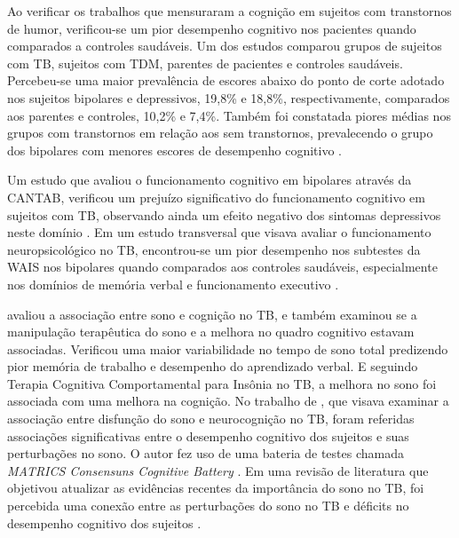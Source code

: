 \documentclass[chapter=TITLE,
               oneside,
               12pt,
               a4paper,
               english,
               brazil]{abntex2}    %
\begin{document}
        Ao verificar os trabalhos que mensuraram a cognição em sujeitos com
        transtornos de humor, verificou-se um pior desempenho cognitivo
        nos pacientes quando comparados a controles saudáveis. Um dos estudos
        comparou grupos de sujeitos com TB, sujeitos com TDM, parentes de
        pacientes e controles saudáveis. Percebeu-se uma maior prevalência
        de escores abaixo do ponto de corte adotado nos sujeitos bipolares e
        depressivos, 19,8\% e 18,8\%, respectivamente, comparados aos parentes
        e controles, 10,2\% e 7,4\%. Também foi constatada piores médias nos
        grupos com transtornos em relação aos sem transtornos, prevalecendo o
        grupo dos bipolares com menores escores de desempenho cognitivo
        \parencite{schneider_cognitive_2008,
        bo_comparison_2019}.

        Um estudo que avaliou o funcionamento cognitivo em bipolares através
        da CANTAB, verificou um prejuízo significativo do funcionamento
        cognitivo em sujeitos com TB, observando ainda um efeito negativo
        dos sintomas depressivos neste domínio
        \parencite{van_der_werf-eldering_cognitive_2010}.
        Em um estudo transversal que visava avaliar o funcionamento
        neuropsicológico no TB, encontrou-se um pior desempenho nos
        subtestes da WAIS nos bipolares quando comparados aos controles
        saudáveis, especialmente nos domínios de memória verbal e
        funcionamento executivo
        \parencite{martinez-aran_cognitive_2004}.

        \textcite{kanady_association_2017} avaliou a associação entre sono e
        cognição no TB, e também examinou se a manipulação terapêutica do sono
        e a melhora no quadro cognitivo estavam associadas.
        Verificou uma maior variabilidade no tempo de sono total predizendo
        pior memória de trabalho e desempenho do aprendizado verbal.
        E seguindo Terapia Cognitiva Comportamental para Insônia no TB, a melhora
        no sono foi associada com uma melhora na cognição.
        No trabalho de \textcite{russo_relationship_2015}, que visava examinar
        a associação entre disfunção do sono e neurocognição no TB, foram
        referidas associações significativas entre o desempenho cognitivo dos
        sujeitos e suas perturbações no sono. O autor fez uso de uma bateria
        de testes chamada \textit{MATRICS Consensuns Cognitive Battery}
        \parencite{nuechterlein_matrics_2008,
        bo_use_2017}.
        Em uma revisão de literatura que objetivou atualizar as evidências
        recentes da importância do sono no TB, foi percebida uma conexão
        entre as perturbações do sono no TB e déficits no desempenho
        cognitivo dos sujeitos
        \parencite{kaplan_sleep_2020}.
\end{document}
